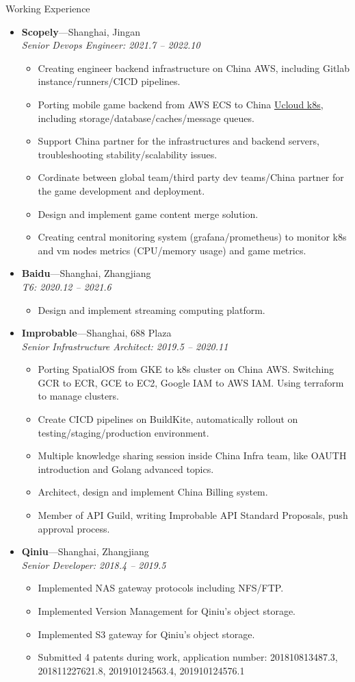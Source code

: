 \documentclass[11pt,oneside]{article}
\newenvironment{ressection}[1]{
	\vspace{4pt}
	{\selectfont\Large#1}
	\begin{itemize}
	\vspace{3pt}
}{
	\end{itemize}
}
\newcommand{\ressubitem}[1]{
	\vspace{-1pt}
	\item \begin{flushleft} #1 \end{flushleft}
}
\newcommand{\resbigitem}[3]{
	\vspace{-5pt}
	\item
	\textbf{#1}---#2 \\
	\textit{#3}
}
\newenvironment{ressubsec}[3]{
	\resbigitem{#1}{#2}{#3}
	\vspace{-2pt}
	\begin{itemize}
}{
    \end{itemize}
}
\begin{document}
\begin{ressection}{Working Experience}

	\begin{ressubsec}{Scopely}{Shanghai, Jingan}{Senior Devops Engineer: 2021.7 -- 2022.10}
		\ressubitem{Creating engineer backend infrastructure on China AWS, including Gitlab instance/runners/CICD pipelines.}
		\ressubitem{Porting mobile game backend from AWS ECS to China \href{https://ucloud.cn}{Ucloud k8s}, including storage/database/caches/message queues.}
		\ressubitem{Support China partner for the infrastructures and backend servers, troubleshooting stability/scalability issues.}
		\ressubitem{Cordinate between global team/third party dev teams/China partner for the game development and deployment.}
		\ressubitem{Design and implement game content merge solution.}
		\ressubitem{Creating central monitoring system (grafana/prometheus) to monitor k8s and vm nodes metrics (CPU/memory usage) and game metrics.}
	\end{ressubsec}

	\begin{ressubsec}{Baidu}{Shanghai, Zhangjiang}{T6: 2020.12 -- 2021.6}
		\ressubitem{Design and implement streaming computing platform.}
	\end{ressubsec}

	\begin{ressubsec}{Improbable}{Shanghai, 688 Plaza}{Senior Infrastructure Architect: 2019.5 -- 2020.11}
		\ressubitem{Porting SpatialOS from GKE to k8s cluster on China AWS. Switching GCR to ECR, GCE to EC2, Google IAM to AWS IAM. Using terraform to manage clusters.}
		\ressubitem{Create CICD pipelines on BuildKite, automatically rollout on testing/staging/production environment.}
		\ressubitem{Multiple knowledge sharing session inside China Infra team, like OAUTH introduction and Golang advanced topics.}
		\ressubitem{Architect, design and implement China Billing system.}
		\ressubitem{Member of API Guild, writing Improbable API Standard Proposals, push approval process.}
	\end{ressubsec}

	\begin{ressubsec}{Qiniu}{Shanghai, Zhangjiang}{Senior Developer: 2018.4 -- 2019.5}
		\ressubitem{Implemented NAS gateway protocols including NFS/FTP.}
		\ressubitem{Implemented Version Management for Qiniu's object storage.}
		\ressubitem{Implemented S3 gateway for Qiniu's object storage.}
		\ressubitem{Submitted 4 patents during work, application number: 201810813487.3, 201811227621.8, 201910124563.4, 201910124576.1}
	\end{ressubsec}


\end{ressection}
\end{document}

